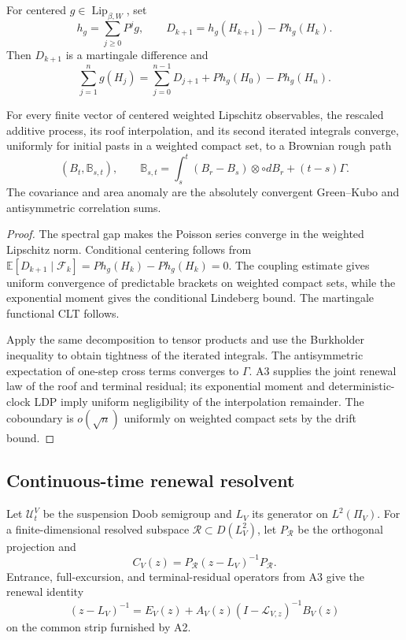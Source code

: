 For centered \(g\in\operatorname{Lip}_{\beta,W}\), set
\[
 h_g=\sum_{j\ge0}P^jg,\qquad
 D_{k+1}=h_g(H_{k+1})-Ph_g(H_k).
\]
Then \(D_{k+1}\) is a martingale difference and
\[
 \sum_{j=1}^ng(H_j)
 =\sum_{j=0}^{n-1}D_{j+1}
  +Ph_g(H_0)-Ph_g(H_n).
\]

\begin{theorem}
\label{thm:r14-a4-rough}
For every finite vector of centered weighted Lipschitz observables, the
rescaled additive process, its roof interpolation, and its second iterated
integrals converge, uniformly for initial pasts in a weighted compact set, to
a Brownian rough path
\[
 (B_t,\mathbb B_{s,t}),\qquad
 \mathbb B_{s,t}
 =\int_s^t(B_r-B_s)\otimes\circ dB_r+(t-s)\Gamma .
\]
The covariance and area anomaly are the absolutely convergent Green--Kubo
and antisymmetric correlation sums.
\end{theorem}

\begin{proof}
The spectral gap makes the Poisson series converge in the weighted Lipschitz
norm.  Conditional centering follows from
\(\mathbb E[D_{k+1}\mid\mathcal F_k]=Ph_g(H_k)-Ph_g(H_k)=0\).
The coupling estimate gives uniform convergence of predictable brackets on
weighted compact sets, while the exponential moment gives the conditional
Lindeberg bound.  The martingale functional CLT follows.

Apply the same decomposition to tensor products and use the
Burkholder inequality to obtain tightness of the iterated integrals.  The
antisymmetric expectation of one-step cross terms converges to \(\Gamma\).
A3 supplies the joint renewal law of the roof and terminal residual; its
exponential moment and deterministic-clock LDP imply uniform negligibility of
the interpolation remainder.  The coboundary is \(o(\sqrt n)\) uniformly on
weighted compact sets by the drift bound.
\end{proof}

\subsection{Continuous-time renewal resolvent}

Let \(\mathcal U_t^V\) be the suspension Doob semigroup and
\(L_V\) its generator on \(L^2(\Pi_V)\).  For a finite-dimensional resolved
subspace \(\mathcal R\subset D(L_V^2)\), let \(P_{\mathcal R}\) be the
orthogonal projection and
\[
 C_V(z)=P_{\mathcal R}(z-L_V)^{-1}P_{\mathcal R}.
\]
Entrance, full-excursion, and terminal-residual operators from A3 give the
renewal identity
\[
 (z-L_V)^{-1}
 =E_V(z)+A_V(z)(I-\mathcal L_{V,z})^{-1}B_V(z)
\]
on the common strip furnished by A2.


